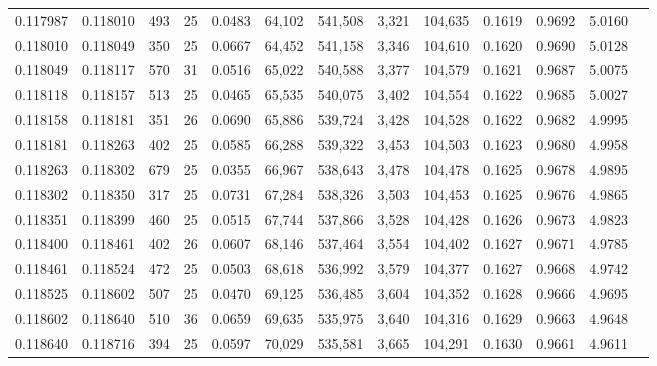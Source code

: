 \begin{tabular}{rrrrrrrrrrrrr}
0.117987 & 0.118010 & 493 &  25 &                                     0.0483 &  64,102 & 541,508 &   3,321 & 104,635 & 0.1619 & 0.9692 & 5.0160 \\
0.118010 & 0.118049 & 350 &  25 &                                     0.0667 &  64,452 & 541,158 &   3,346 & 104,610 & 0.1620 & 0.9690 & 5.0128 \\
0.118049 & 0.118117 & 570 &  31 &                                     0.0516 &  65,022 & 540,588 &   3,377 & 104,579 & 0.1621 & 0.9687 & 5.0075 \\
0.118118 & 0.118157 & 513 &  25 &                                     0.0465 &  65,535 & 540,075 &   3,402 & 104,554 & 0.1622 & 0.9685 & 5.0027 \\
0.118158 & 0.118181 & 351 &  26 &                                     0.0690 &  65,886 & 539,724 &   3,428 & 104,528 & 0.1622 & 0.9682 & 4.9995 \\
0.118181 & 0.118263 & 402 &  25 &                                     0.0585 &  66,288 & 539,322 &   3,453 & 104,503 & 0.1623 & 0.9680 & 4.9958 \\
0.118263 & 0.118302 & 679 &  25 &                                     0.0355 &  66,967 & 538,643 &   3,478 & 104,478 & 0.1625 & 0.9678 & 4.9895 \\
0.118302 & 0.118350 & 317 &  25 &                                     0.0731 &  67,284 & 538,326 &   3,503 & 104,453 & 0.1625 & 0.9676 & 4.9865 \\
0.118351 & 0.118399 & 460 &  25 &                                     0.0515 &  67,744 & 537,866 &   3,528 & 104,428 & 0.1626 & 0.9673 & 4.9823 \\
0.118400 & 0.118461 & 402 &  26 &                                     0.0607 &  68,146 & 537,464 &   3,554 & 104,402 & 0.1627 & 0.9671 & 4.9785 \\
0.118461 & 0.118524 & 472 &  25 &                                     0.0503 &  68,618 & 536,992 &   3,579 & 104,377 & 0.1627 & 0.9668 & 4.9742 \\
0.118525 & 0.118602 & 507 &  25 &                                     0.0470 &  69,125 & 536,485 &   3,604 & 104,352 & 0.1628 & 0.9666 & 4.9695 \\
0.118602 & 0.118640 & 510 &  36 &                                     0.0659 &  69,635 & 535,975 &   3,640 & 104,316 & 0.1629 & 0.9663 & 4.9648 \\
0.118640 & 0.118716 & 394 &  25 &                                     0.0597 &  70,029 & 535,581 &   3,665 & 104,291 & 0.1630 & 0.9661 & 4.9611 \\

\end{tabular}
